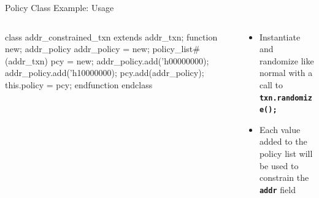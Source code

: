 \documentclass[aspectratio=169]{beamer}
\newcommand{\code}[1]{
  \textbf{\texttt{#1}}
}
\begin{document}
\begin{frame}[fragile]{Policy Class Example: Usage}
\begin{columns}
\begin{column}{0.65\textwidth}
\begin{svcode}
class addr_constrained_txn extends addr_txn;
  function new;
    addr_policy addr_policy = new;
    policy_list#(addr_txn) pcy = new;
    addr_policy.add('h00000000);
    addr_policy.add('h10000000);
    pcy.add(addr_policy);
    this.policy = {pcy};
  endfunction
endclass
\end{svcode}
\end{column}
\begin{column}{0.3\textwidth}
  \begin{itemize}
    \item Instantiate and randomize like normal with a call to \code{txn.randomize();}
    \item Each value added to the policy list will be used to constrain the \code{addr} field
  \end{itemize}
\end{column}
\end{columns}
\end{frame}

\begin{frame}
\end{frame}
\end{document}
